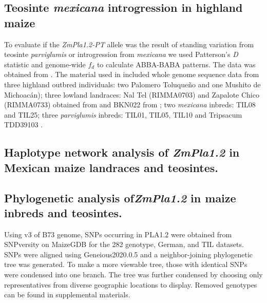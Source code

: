 \documentclass[9pt,twocolumn,twoside,lineno]{gsajnl}
\begin{document}
\subsection{Teosinte \textit{mexicana} introgression in highland maize}
To evaluate if the \textit{ZmPla1.2-PT} allele was the result of standing variation from teosinte \textit{parviglumis} or introgression from \textit{mexicana} we used Patterson's \textit{D} statistic and genome-wide $f_{d}$ to calculate ABBA-BABA patterns. 
The data was obtained from \cite{Gonzalez-Segovia2019-jy}. 
The material used in \cite{Gonzalez-Segovia2019-jy} included whole genome sequence data from three highland outbred individuals: two Palomero Toluqueño and one Mushito de Michoacán); three lowland landraces: Nal Tel (RIMMA0703) and Zapalote Chico (RIMMA0733) obtained from \cite{Wang2017-bc} and  BKN022 from \cite{Bukowski2017-ng}; two \textit{mexicana} inbreds: TIL08 and TIL25; three \textit{parviglumis} inbreds: TIL01, TIL05, TIL10 and Tripsacum TDD39103 \cite{Bukowski2017-ng}. 

\subsection{Haplotype network analysis of \textit{ZmPla1.2} in Mexican maize landraces and teosintes.}

\subsection{Phylogenetic analysis of\textit{ZmPla1.2} in maize inbreds and teosintes.}
Using v3 of B73 genome, SNPs occurring in PLA1.2 were obtained from SNPversity on MaizeGDB for the 282 genotype, German, and TIL datasets. SNPs were aligned using Geneious2020.0.5 and a neighbor-joining phylogenetic tree was generated. To make a more viewable tree, those with identical SNPs were condensed into one branch. The tree was further condensed by choosing only representatives from diverse geographic locations to display. Removed genotypes can be found in supplemental materials. 
\end{document}
